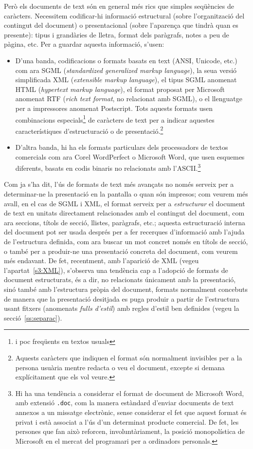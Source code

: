 Però els documents de text són en general més rics que simples
seqüències de caràcters. Necessitem codificar-hi informació
estructural (sobre l'organització del contingut del document) o
presentacional (sobre l'aparença que tindrà quan es presente): 
tipus i grandàries de lletra, format dels paràgrafs, notes a peu
de pàgina, etc. Per a guardar aquesta informació, s'usen:
\begin{itemize}
\item D'una banda, codificacions o formats basats en text (ANSI,
  Unicode, etc.) com ara
  SGML (\emph{standardized generalized markup language}), la seua
  versió simplificada XML (\emph{extensible markup language}), el
  tipus SGML anomenat HTML (\emph{hypertext markup language}), el
  format proposat per Microsoft anomenat RTF (\emph{rich text format},
  no relacionat amb SGML), o el llenguatge per a impressores anomenat
  Postscript. Tots aquests formats usen combinacions
  especials\footnote{i poc freqüents en textos usuals} de
  caràcters de text per a indicar aquestes característiques
  d'estructuració o de presentació.\footnote{Aquests caràcters que
    indiquen el format són
    normalment invisibles per a la persona usuària mentre redacta o
    veu el document, excepte si demana explícitament que els vol
    veure.}
\item D'altra banda, hi ha els formats particulars dels processadors
  de textos comercials com ara Corel WordPerfect o Microsoft Word, que
  usen esquemes diferents, basats en codis binaris no relacionats amb
  l'ASCII.\footnote{Hi ha una tendència a considerar el format de
    document de Microsoft Word, amb extensió \texttt{.doc}, com la
    manera estàndard d'enviar documents de text annexos a un missatge
    electrònic, sense considerar el fet que aquest format és privat i
    està
    associat a l'ús d'un determinat producte comercial. De fet, les
    persones que fan això reforcen, involuntàriament, la
    posició monopolística de Microsoft en el mercat del programari per
  a ordinadors personals.}
\end{itemize}
Com ja s'ha dit, l'ús de formats de text més avançats no només serveix
per a determinar-ne la presentació en la pantalla o quan són impresos;
com veurem més avall, en el cas de SGML i XML, el format serveix per a
\emph{estructurar} el document de text en unitats directament
relacionades amb el contingut del document, com ara seccions, títols
de secció, llistes, paràgrafs, etc.; aquesta estructuració interna del
document pot ser usada després per a fer recerques d'informació amb
l'ajuda de l'estructura definida, com ara buscar un mot concret només
en títols de secció, o també per a produir-ne una presentació concreta
del document, com veurem més endavant. De fet, recentment, amb
l'aparició de XML (vegeu l'apartat~\ref{s3:XML}), s'observa una tendència cap a
l'adopció de formats de document estructurats, és a dir, no
relacionats únicament amb la presentació, sinó també amb l'estructura
pròpia del document, formats normalment concebuts de manera que la
presentació desitjada es puga produir a partir de l'estructura usant
fitxers (anomenats \emph{fulls d'estil}) amb regles d'estil ben
definides (vegeu la secció~\ref{ss:separac}).

